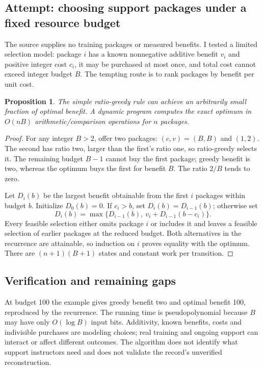 \documentclass[11pt]{article}
\newtheorem{proposition}{Proposition}
\begin{document}
\subsection{Attempt: choosing support packages under a fixed resource budget}
The source supplies no training packages or measured benefits. I tested a limited selection model: package $i$ has a known nonnegative additive benefit $v_i$ and positive integer cost $c_i$, it may be purchased at most once, and total cost cannot exceed integer budget $B$. The tempting route is to rank packages by benefit per unit cost.
\begin{proposition}
The simple ratio-greedy rule can achieve an arbitrarily small fraction of optimal benefit. A dynamic program computes the exact optimum in $O(nB)$ arithmetic/comparison operations for $n$ packages.
\end{proposition}
\begin{proof}
For any integer $B>2$, offer two packages: $(c,v)=(B,B)$ and $(1,2)$. The second has ratio two, larger than the first's ratio one, so ratio-greedy selects it. The remaining budget $B-1$ cannot buy the first package; greedy benefit is two, whereas the optimum buys the first for benefit $B$. The ratio $2/B$ tends to zero.

Let $D_i(b)$ be the largest benefit obtainable from the first $i$ packages within budget $b$. Initialize $D_0(b)=0$. If $c_i>b$, set $D_i(b)=D_{i-1}(b)$; otherwise set
\[
D_i(b)=\max\{D_{i-1}(b),\ v_i+D_{i-1}(b-c_i)\}.
\]
Every feasible selection either omits package $i$ or includes it and leaves a feasible selection of earlier packages at the reduced budget. Both alternatives in the recurrence are attainable, so induction on $i$ proves equality with the optimum. There are $(n+1)(B+1)$ states and constant work per transition.
\end{proof}
\subsection{Verification and remaining gaps}
At budget 100 the example gives greedy benefit two and optimal benefit 100, reproduced by the recurrence. The running time is pseudopolynomial because $B$ may have only $O(\log B)$ input bits. Additivity, known benefits, costs and indivisible purchases are modeling choices; real training and ongoing support can interact or affect different outcomes. The algorithm does not identify what support instructors need and does not validate the record's unverified reconstruction.
\end{document}
